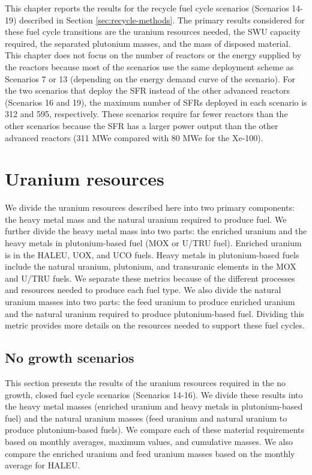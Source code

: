 This chapter reports the results for the recycle fuel cycle 
scenarios (Scenarios 14-19) described 
in Section \ref{sec:recycle-methods}. The primary results considered 
for these fuel cycle transitions are the uranium resources needed, 
the \gls{SWU} capacity required, the separated plutonium masses, 
and the mass of disposed material. This chapter does not focus 
on the number of reactors or the energy supplied by 
the reactors because most of the scenarios use the same 
deployment scheme as Scenarios 7 or 13 (depending on 
the energy demand curve of the scenario). For the two 
scenarios that deploy the \gls{SFR} instead of the other 
advanced reactors (Scenarios 16 and 19), the maximum number 
of \glspl{SFR} deployed in each scenario is 312 and 595, 
respectively. 
These scenarios require far fewer reactors than the other scenarios 
because the \gls{SFR} has a larger power output than the other 
advanced reactors (311 MWe compared with 80 MWe for the Xe-100).

\section{Uranium resources}
We divide the uranium resources described here into two primary 
components: the heavy metal mass and the natural uranium 
required to produce fuel. We further divide the heavy metal 
mass into two parts: the enriched uranium and the 
heavy metals in plutonium-based fuel (\gls{MOX} or U/TRU fuel). 
Enriched uranium is in the 
\gls{HALEU}, \gls{UOX}, and UCO fuels. Heavy metals in plutonium-based 
fuels include the natural uranium, plutonium, and transuranic 
elements in 
the \gls{MOX} and U/TRU fuels. We separate these metrics 
because of the different processes and resources needed to 
produce each fuel type. We also divide the natural uranium 
masses into two parts: the feed uranium to produce enriched uranium 
and the natural uranium required to produce 
plutonium-based fuel. Dividing this metric provides more details 
on the resources needed to support these fuel cycles. 

\subsection{No growth scenarios}
This section presents the results of the uranium resources required 
in the no growth, closed fuel cycle scenarios (Scenarios 14-16). 
We divide these results into the heavy metal masses (enriched uranium 
and heavy metals in plutonium-based fuel) and the natural 
uranium masses (feed uranium and natural uranium to produce 
plutonium-based fuels). We compare each of these material requirements 
based on monthly averages, maximum values, 
and cumulative masses. We also compare the enriched uranium and feed uranium 
masses based on the monthly average for \gls{HALEU}. 

